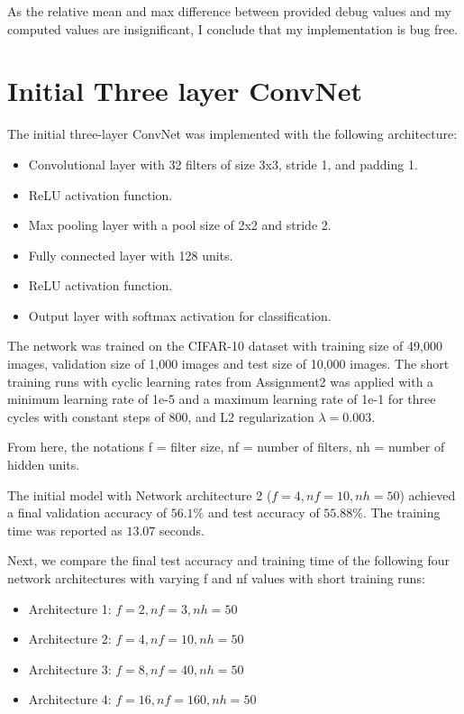 \documentclass[11pt]{article}
\begin{document}
As the relative mean and max difference between provided debug values and my computed values are insignificant, I conclude that my implementation is bug free.

\section*{Initial Three layer ConvNet}

The initial three-layer ConvNet was implemented with the following architecture:
\begin{itemize}
  \item Convolutional layer with 32 filters of size 3x3, stride 1, and padding 1.
  \item ReLU activation function.
  \item Max pooling layer with a pool size of 2x2 and stride 2.
  \item Fully connected layer with 128 units.
  \item ReLU activation function.
  \item Output layer with softmax activation for classification.
\end{itemize}

The network was trained on the CIFAR-10 dataset with training size of 49,000 images, validation size of 1,000 images and test size of 10,000 images. The short training runs with cyclic learning rates from Assignment2 was applied with a minimum learning rate of 1e-5 and a maximum learning rate of 1e-1 for three cycles with constant steps of 800, and L2 regularization $\lambda = 0.003$.

From here, the notations f = filter size, nf = number of filters, nh = number of hidden units.

The initial model with Network architecture 2 ($f=4, nf=10, nh=50$) achieved a final validation accuracy of $56.1\%$ and test accuracy of $55.88\%$. The training time was reported as $13.07$ seconds. 

Next, we compare the final test accuracy and training time of the following four network architectures with varying f and nf values with short training runs:

\begin{itemize}
  \item Architecture 1: $f=2, nf=3, nh=50$
  \item Architecture 2: $f=4, nf=10, nh=50$
  \item Architecture 3: $f=8, nf=40, nh=50$
  \item Architecture 4: $f=16, nf=160, nh=50$
\end{itemize}
\end{document}

